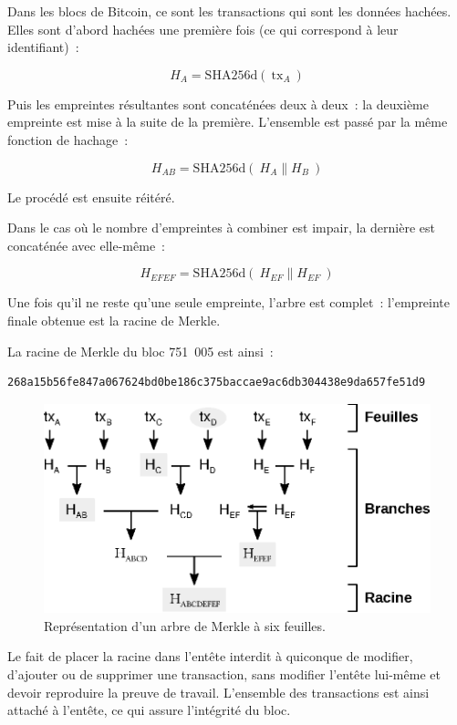 Dans les blocs de Bitcoin, ce sont les transactions qui sont les données hachées. Elles sont d'abord hachées une première fois (ce qui correspond à leur identifiant)~:

{ \small
\[
H_A = \mathrm{SHA256d}(~\mathrm{tx}_A~)
\]
}

Puis les empreintes résultantes sont concaténées deux à deux~: la deuxième empreinte est mise à la suite de la première. L'ensemble est passé par la même fonction de hachage~:

{ \small
\[
H_{A\!B} = \mathrm{SHA256d}(~H_A \parallel H_B~)
\]
}

Le procédé est ensuite réitéré.

Dans le cas où le nombre d'empreintes à combiner est impair, la dernière est concaténée avec elle-même~:

{ \small
\[
H_{E\!F\!E\!F} = \mathrm{SHA256d}(~H_{E\!F} \parallel H_{E\!F}~)
\]
}

Une fois qu'il ne reste qu'une seule empreinte, l'arbre est complet~: l'empreinte finale obtenue est la racine de Merkle.

La racine de Merkle du bloc 751~005 est ainsi~:

\begin{Verbatim}[fontsize=\footnotesize]
268a15b56fe847a067624bd0be186c375baccae9ac6db304438e9da657fe51d9
\end{Verbatim}

\begin{figure}[h]
  \centering
  \includegraphics[scale=0.8]{img/merkle-tree.eps}
  \caption{Représentation d'un arbre de Merkle à six feuilles.}
  \label{fig:merkle-tree}
\end{figure}

Le fait de placer la racine dans l'entête interdit à quiconque de modifier, d'ajouter ou de supprimer une transaction, sans modifier l'entête lui-même et devoir reproduire la preuve de travail. L'ensemble des transactions est ainsi attaché à l'entête, ce qui assure l'intégrité du bloc.

